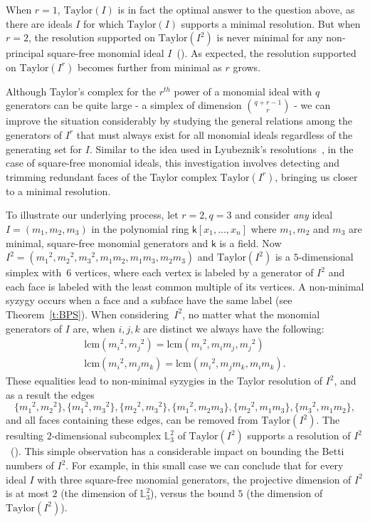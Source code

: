 \documentclass[11pt]{article}
\theoremstyle{definition}
\numberwithin{equation}{section}
\newcommand{\Taylor}{\mathrm{Taylor}}
\newcommand{\lcm}{\mathrm{lcm}}
\newcommand{\LL}{\mathbb{L}}
\newcommand{\sfk}{\mathsf k}
\begin{document}
When $r=1$, $\Taylor(I)$ is in fact the optimal answer to the question
above, as there are ideals $I$ for which $\Taylor(I)$ supports a
minimal resolution.  But when $r=2$, the resolution supported on
$\Taylor(I^2)$ is never minimal for any non-principal square-free
monomial ideal $I$~\textup{(}\cite{L2}\textup{)}.  As expected, the resolution supported on $\Taylor(I^r)$
becomes further from minimal as $r$ grows.

Although Taylor's complex for the $r^{th}$ power of a monomial ideal
with $q$ generators can be quite large - a simplex of dimension
$\binom{q+r-1}{r}$ - we can improve the situation considerably by
studying the general relations among the generators of $I^r$ that must
always exist for all monomial ideals regardless of the generating set
for $I$.  Similar to the idea used in Lyubeznik's
resolutions~\cite{L}, in the case of square-free monomial ideals, this
investigation involves detecting and trimming redundant faces of the
Taylor complex $\Taylor(I^r)$, bringing us closer to a minimal
resolution.

To illustrate our underlying process, let $r=2, q=3$ and consider {\it
  any} ideal $I = (m_1, m_2, m_3)$ in the polynomial ring $\sfk[x_1,
  \ldots, x_n]$ where $m_1, m_2$ and $m_3$ are minimal, square-free
monomial generators and $\sfk$ is a field.  Now $I^2 = ({m_1}^2,
{m_2}^2, {m_3}^2, m_1m_2, m_1m_3, m_2m_3)$ and $\Taylor(I^2)$ is a
$5$-dimensional simplex with~$6$ vertices, where each vertex is
labeled by a generator of $I^2$ and each face is labeled with the
least common multiple of its vertices. A non-minimal syzygy occurs
when a face and a subface have the same label \textup{(}see Theorem~\ref{t:BPS}\textup{)}. When
considering~$I^2$, no matter what the monomial generators of $I$ are,
when $i, j, k$ are distinct we always have the following: 
\begin{gather*}
\lcm({m_i}^2, {m_j}^2)=\lcm({{m_i}^2,m_im_j,{m_j}^2}) \\
\lcm({m_i}^2, m_jm_k)=\lcm({m_i}^2, m_jm_k,m_im_k).
\end{gather*} These equalities
lead to non-minimal syzygies in the Taylor resolution of $I^2$, and as
a result the edges
$$\{{m_1}^2, {m_2}^2\}, \{{m_1}^2, {m_3}^2\}, \{{m_2}^2, {m_3}^2\},
\{{m_1}^2, m_2m_3\}, \{{m_2}^2, m_1m_3\}, \{{m_3}^2, m_1m_2\},$$ and
all faces containing these edges, can be removed from
$\Taylor(I^2)$. The resulting $2$-dimensional subcomplex $\LL_3^2$ of
$\Taylor(I^2)$ supports a resolution of $I^2$~\textup{(}\cite{L2}\textup{)}. This
simple observation has a considerable impact on bounding the Betti numbers of
$I^2$. For example, in this small case we can conclude that for every
ideal $I$ with three square-free monomial generators, the projective
dimension of $I^2$ is at most $2$ \textup{(}the dimension of $\LL_3^2$\textup{)}, versus 
the bound $5$ \textup{(}the dimension of $\Taylor(I^2)$\textup{)}.
\end{document}
